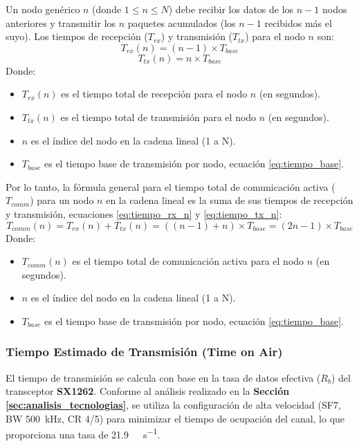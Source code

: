 Un nodo genérico $n$ (donde $1 \le n \le N$) debe recibir los datos de los $n-1$ nodos anteriores y transmitir los $n$ paquetes acumulados (los $n-1$ recibidos más el suyo). Los tiempos de recepción ($T_{rx}$) y transmisión ($T_{tx}$) para el nodo $n$ son:
\begin{equation} \label{eq:tiempo_rx_n}
T_{rx}(n) = (n-1) \times T_{base}
\end{equation}
\begin{equation} \label{eq:tiempo_tx_n}
T_{tx}(n) = n \times T_{base}
\end{equation}
Donde:
\begin{itemize}
    \item $T_{rx}(n)$ es el tiempo total de recepción para el nodo $n$ (en segundos).
    \item $T_{tx}(n)$ es el tiempo total de transmisión para el nodo $n$ (en segundos).
    \item $n$ es el índice del nodo en la cadena lineal (1 a N).
    \item $T_{base}$ es el tiempo base de transmisión por nodo, ecuación \eqref{eq:tiempo_base}.
\end{itemize}

Por lo tanto, la fórmula general para el tiempo total de comunicación activa ($T_{comm}$) para un nodo $n$ en la cadena lineal es la suma de sus tiempos de recepción y transmisión, ecuaciones \eqref{eq:tiempo_rx_n} y \eqref{eq:tiempo_tx_n}:
\begin{equation} \label{eq:tiempo_comm_nodo_n}
T_{comm}(n) = T_{rx}(n) + T_{tx}(n) = ((n-1) + n) \times T_{base} = \boxed{(2n - 1) \times T_{base}}
\end{equation}
Donde:
\begin{itemize}
    \item $T_{comm}(n)$ es el tiempo total de comunicación activa para el nodo $n$ (en segundos).
    \item $n$ es el índice del nodo en la cadena lineal (1 a N).
    \item $T_{base}$ es el tiempo base de transmisión por nodo, ecuación \eqref{eq:tiempo_base}.
\end{itemize}


\subsubsection*{Tiempo Estimado de Transmisión (Time on Air)}
\label{ssubsec:tiempo_tx}

El tiempo de transmisión se calcula con base en la tasa de datos efectiva ($R_b$) del transceptor \textbf{SX1262}. Conforme al análisis realizado en la \textbf{Sección \ref{sec:analisis_tecnologias}}, se utiliza la configuración de alta velocidad (SF7, BW \SI{500}{\kilo\hertz}, CR 4/5) para minimizar el tiempo de ocupación del canal, lo que proporciona una tasa de \SI[per-mode = symbol]{21.9}{\kilo\bit\per\second}.

